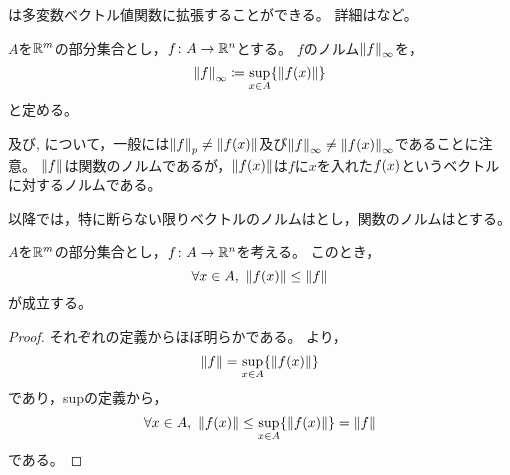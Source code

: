 \documentclass[b5paper,draft]{ltjsbook}
\begin{document}
\begin{supple}
    は多変数ベクトル値関数に拡張することができる。
    詳細は\cite{nomura}など。
\end{supple}

\begin{defi}
    $A$を$\mathbb{R}^m$の部分集合とし，$f\colon A\to \mathbb{R}^n$とする。
    $f$のノルム$\norm{f}_\infty$を，
    \begin{equation}
        \norm{f}_\infty \coloneqq \sup_{x \in A}\bra{ \norm{\fun{f}{x}} }
    \end{equation}
    と定める。
\end{defi}

\begin{rem}
    及び, について，一般には$\norm{f}_p\ne\norm{\fun{f}{x}}$及び$\norm{f}_\infty\ne\norm{\fun{f}{x}}_\infty$であることに注意。
    $\norm{f}$は関数のノルムであるが，$\norm{\fun{f}{x}}$は$f$に$x$を入れた$\fun{f}{x}$というベクトルに対するノルムである。
\end{rem}

以降では，特に断らない限りベクトルのノルムはとし，関数のノルムはとする。

\begin{lem}
    $A$を$\mathbb{R}^m$の部分集合とし，$f\colon A\to \mathbb{R}^n$を考える。
    このとき，
    \begin{equation}
        \forall x\in A,\ \norm{\fun{f}{x}}\leq \norm{f}
    \end{equation}
    が成立する。
    \begin{proof}
        それぞれの定義からほぼ明らかである。
        より，
        \begin{equation}
            \norm{f} = \sup_{x \in A}\bra{ \norm{\fun{f}{x}} }
        \end{equation}
        であり，supの定義から，
        \begin{equation}
            \forall x\in A,\  \norm{\fun{f}{x}}\leq \sup_{x \in A}\bra{ \norm{\fun{f}{x}} } = \norm{f}
        \end{equation}
        である。
    \end{proof}
\end{lem}
\end{document}

